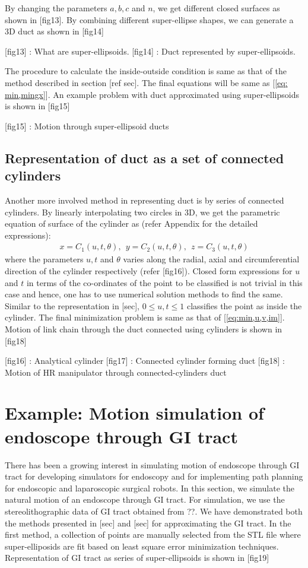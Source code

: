 \documentclass[11pt,a4paper]{article}
\begin{document}
By changing the parameters $a,b,c$ and $n$, we get different closed surfaces as shown in [fig13]. By combining different super-ellipse shapes, we can generate a 3D duct as shown in [fig14]

[fig13] : What are super-ellipsoids.
[fig14] : Duct represented by super-ellipsoids.

The procedure to calculate the inside-outside condition is same as that of the method described in section [ref sec]. The final equations will be same as [\ref{eq: min,mingx}]. An example problem with duct approximated using super-ellipsoids is shown in [fig15]

[fig15] : Motion through super-ellipsoid ducts


\subsection{Representation of duct as a set of connected cylinders}
Another more involved method in representing duct is by series of connected cylinders. By linearly interpolating two circles in 3D, we get the parametric equation of surface of the cylinder as (refer Appendix for the detailed expressions):
\begin{align}
\label{eq:cylinder}
x = C_1(u,t,\theta),~~y = C_2(u,t,\theta),~~z = C_3(u,t,\theta)
\end{align}
where the parameters $u,t$ and $\theta$ varies along the radial, axial and circumferential direction of the cylinder respectively (refer [fig16]). Closed form expressions for $u$ and $t$ in terms of the co-ordinates of the point  to be classified is not trivial in this case and hence, one has to use numerical solution methods to find the same. Similar to the representation in [sec], $0\leq u,t \leq 1$ classifies the point as inside the cylinder. The final minimization problem is same as that of [\ref{eq:min,u,v,im}]. Motion of link chain through the duct connected using cylinders is shown in [fig18]

[fig16] : Analytical cylinder
[fig17] : Connected cylinder forming duct
[fig18] : Motion of HR manipulator through connected-cylinders duct

\section{Example: Motion simulation of endoscope through GI tract}
There has been a growing interest in simulating motion of endoscope through GI tract for developing simulators for endoscopy and for implementing path planning for endoscopic and laparoscopic surgical robots. In this section, we simulate the natural motion of an endoscope through GI tract. For simulation, we use the stereolithographic data of GI tract obtained from ??. We have demonstrated both the methods presented in [sec] and [sec] for approximating the GI tract. In the first method, a collection of points are manually selected from the STL file where super-elliposids are fit based on least square error minimization techniques. Representation of GI tract as series of super-ellipsoids is shown in [fig19]
\end{document}

